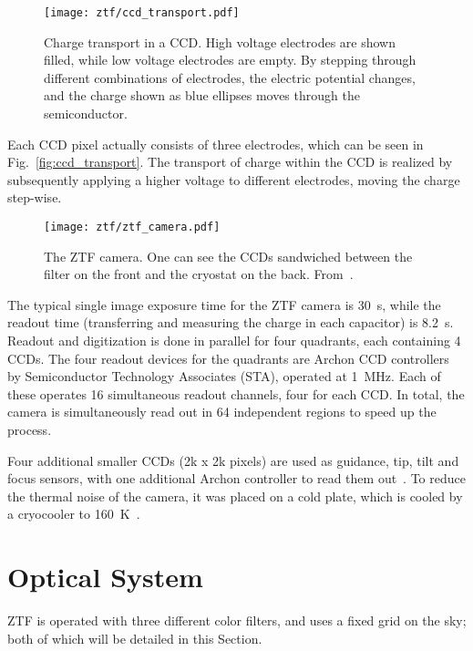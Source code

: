 \begin{figure}[htb]
    \texttt{[image: ztf/ccd\_transport.pdf]}
    \caption[Charge transport in a CCD]{Charge transport in a CCD. High voltage electrodes are shown filled, while low voltage electrodes are empty. By stepping through different combinations of electrodes, the electric potential changes, and the charge shown as blue ellipses moves through the semiconductor.}
\end{figure}

Each CCD pixel actually consists of three electrodes, which can be seen in Fig.~\ref{fig:ccd_transport}. The transport of charge within the CCD is realized by subsequently applying a higher voltage to different electrodes, moving the charge step-wise.

\begin{figure}[htb]
    \texttt{[image: ztf/ztf\_camera.pdf]}
    \caption[ZTF camera]{The ZTF camera. One can see the CCDs sandwiched between the filter on the front and the cryostat on the back. From~\cite{Bellm2019}.}
\end{figure}

The typical single image exposure time for the ZTF camera is \SI{30}{\second}, while the readout time (transferring and measuring the charge in each capacitor) is \SI{8.2}{\second}. Readout and digitization is done in parallel for four quadrants, each containing 4 CCDs. The four readout devices for the quadrants are Archon CCD controllers by Semiconductor Technology Associates (STA), operated at \SI{1}{\mega\Hz}. Each of these operates 16 simultaneous readout channels, four for each CCD. In total, the camera is simultaneously read out in 64 independent regions to speed up the process.

Four additional smaller CCDs (2k x 2k pixels) are used as guidance, tip, tilt and focus sensors, with one additional Archon controller to read them out~. To reduce the thermal noise of the camera, it was placed on a cold plate, which is cooled by a cryocooler to \SI{160}{\kelvin}~\cite{Dekany2016}.

\section{Optical System}
ZTF is operated with three different color filters, and uses a fixed grid on the sky; both of which will be detailed in this Section.

